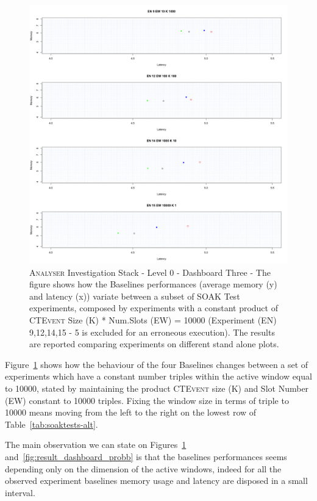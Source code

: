 \begin{figure}[h!tbp]
	\centering
	\includegraphics[width=0.75\linewidth]{images/dashboard-3-split}	
	\caption[\textsc{Analyser} Investigation Stack - Level 0 - Dashboard Three - Split Version]	{\textsc{Analyser} Investigation Stack - Level 0 - Dashboard Three - The figure shows how the Baselines performances (average memory (y) and latency (x)) variate between a subset of SOAK Test experiments, composed by experiments with a constant product of \textsc{CTEvent} Size (K) * Num.Slots (EW) = 10000 (Experiment (EN) 9,12,14,15 - 5 is excluded for an erroneous execution).  The results are reported comparing experiments on different stand alone plots.}
	\label{fig:result_dashboard_proba}
\end{figure}

Figure~\ref{fig:result_dashboard_proba}  shows how the behaviour of the four Baselines changes between a set of experiments which have a constant number triples within the active window equal to 10000, stated by maintaining the product \textsc{CTEvent} size (K) and Slot Number (EW) constant to 10000 triples. Fixing the window size in terms of triple to 10000 means moving from the left to the right on the lowest row of Table~\ref{tab:soaktests-alt}. 

The main observation we can state on Figures~\ref{fig:result_dashboard_proba} and~\ref{fig:result_dashboard_probb}  is that the baselines performances seems depending only on the dimension of the active windows, indeed for all the observed experiment  baselines memory usage and latency are disposed in a small interval.

